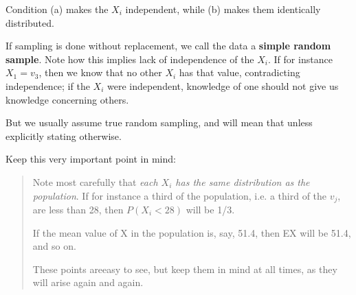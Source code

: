 Condition (a) makes the $X_i$ independent, while (b) makes them
identically distributed.

If sampling is done without replacement, we call the data a {\bf simple
random sample}.  Note how this implies lack of independence of the
$X_i$.  If for instance $X_1 = v_3$, then we know that no other $X_i$
has that value, contradicting independence; if the $X_i$ were
independent, knowledge of one should not give us knowledge concerning
others.

But we usually assume true random sampling, and will mean that unless
explicitly stating otherwise.

Keep this very important point in mind:

\begin{quote}

Note most carefully that {\it each $X_i$ has the same distribution as
the population}.  If for instance a third of the population, i.e. a
third of the $v_j$, are less than 28, then $P(X_i < 28)$ will be 1/3.

If the mean value of X in the population is, say, 51.4, then EX will
be 51.4, and so on.

These points areeasy to see, but keep them in mind at all times, as
they will arise again and again.

\end{quote}

% 

